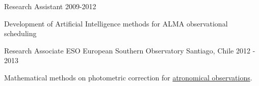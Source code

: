 \begin{cventries}
    \cventry
{Research Assistant} %
{} %
{} %
{2009-2012} %
{
	\begin{cvitems} %
		\item {Development of Artificial Intelligence methods for ALMA observational scheduling}
	\end{cvitems}
}



\cventry
{Research Associate} %
{ESO European Southern Observatory} %
{Santiago, Chile} %
{2012 - 2013} %
{
	\begin{cvitems} %
		\item {Mathematical methods on photometric correction for \href{http://www.eso.org/public/teles-instr/vlt}{atronomical observations}.}
	\end{cvitems}
}



\end{cventries}

